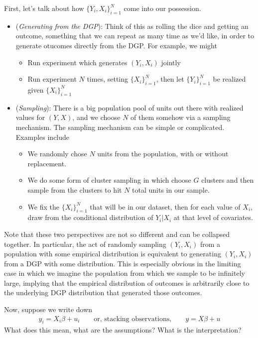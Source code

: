 \documentclass[12pt]{article}
\theoremstyle{plain}
\theoremstyle{definition}
\theoremstyle{remark}
\begin{document}
First, let's talk about how $\{Y_i,X_i\}_{i=1}^N$ come into our
possession.
\begin{itemize}
  \item (\emph{Generating from the DGP}):
    Think of this as rolling the dice and getting an outcome, something
    that we can repeat as many time as we'd like, in order to generate
    otucomes directly from the DGP.
    For example, we might
    \begin{itemize}
      \item Run experiment which generates $(Y_i,X_i)$ jointly
      \item Run experiment $N$ times, setting $\{X_i\}_{i=1}^N$, then
        let $\{Y_i\}_{i=1}^N$ be realized given $\{X_i\}_{i=1}^N$
    \end{itemize}

  \item (\emph{Sampling}):
    There is a big population pool of units out there with realized
    values for $(Y,X)$, and we choose $N$ of them somehow via a sampling
    mechanism.
    The sampling mechanism can be simple or complicated.
    Examples include
    \begin{itemize}
      \item We randomly chose $N$ units from the population, with or
        without replacement.
      \item We do some form of cluster sampling in which choose $G$
        clusters and then sample from the clusters to hit $N$ total
        units in our sample.
      \item We fix the $\{X_i\}_{i=1}^N$ that will be in our dataset,
        then for each value of $X_i$, draw from the conditional
        distribution of $Y_i|X_i$ at that level of covariates.
    \end{itemize}
\end{itemize}
Note that these two perspectives are not so different and can be
collapsed together.
In particular,
the act of randomly sampling $(Y_i,X_i)$ from a population with some
empirical distribution
is equivalent to
generating $(Y_i,X_i)$ from a DGP with some distribution.
This is especially obvious in the limiting case in which we imagine the
population from which we sample to be infinitely large, implying that
the empirical distribution of outcomes is arbitrarily close to the
underlying DGP distribution that generated those outcomes.

Now, suppose we write down
\begin{align*}
  y_i=X_i\beta + u_i
  \qquad\text{or, stacking observations,}\qquad
  y=X\beta + u
\end{align*}
What does this mean, what are the assumptions?
What is the interpretation?
\end{document}

